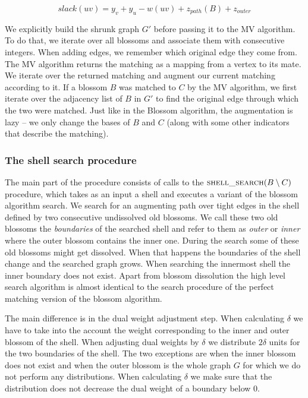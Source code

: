 \[ slack(uv) = y_v + y_u - w(uv) + z_{path}(B) + z_{outer} \]

We explicitly build the shrunk graph $G'$ before passing it to the MV algorithm. To do that, we iterate over all blossoms and associate them with consecutive integers. When adding edges, we remember which original edge they come from. The MV algorithm returns the matching as a mapping from a vertex to its mate. We iterate over the returned matching and augment our current matching according to it. If a blossom $B$ was matched to $C$ by the MV algorithm, we first iterate over the adjacency list of $B$ in $G'$ to find the original edge through which the two were matched. Just like in the Blossom algorithm, the augmentation is lazy – we only change the bases of $B$ and $C$ (along with some other indicators that describe the matching).

\subsubsection{The shell search procedure}

The main part of the procedure consists of calls to the $\textsc{shell\_search}(B \setminus C)$ procedure, which takes as an input a shell and executes a variant of the blossom algorithm search. We search for an augmenting path over tight edges in the shell defined by two consecutive undissolved old blossoms. We call these two old blossoms the \textit{boundaries} of the searched shell and refer to them as \textit{outer} or \textit{inner} where the outer blossom contains the inner one. During the search some of these old blossoms might get dissolved. When that happens the boundaries of the shell change and the searched graph grows. When searching the innermost shell the inner boundary does not exist. Apart from blossom dissolution the high level search algorithm is almost identical to the search procedure of the perfect matching version of the blossom algorithm.

The main difference is in the dual weight adjustment step. When calculating $\delta$ we have to take into the account the weight corresponding to the inner and outer blossom of the shell. When adjusting dual weights by $\delta$ we distribute $2\delta$ units for the two boundaries of the shell. The two exceptions are when the inner blossom does not exist and when the outer blossom is the whole graph $G$ for which we do not perform any distributions. When calculating $\delta$ we make sure that the distribution does not decrease the dual weight of a boundary below $0$.

